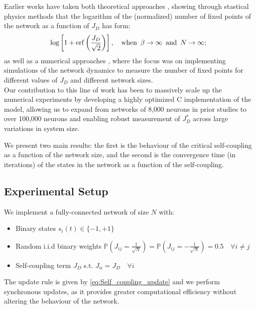 \documentclass[a4paper,12pt]{report}
\begin{document}
Earlier works have taken both theoretical approaches \cite{Scardecchia2023}, showing through stastical 
physics methods that the logarithm of the (normalized) number of fixed points of the 
network as a function of $J_D$ has form:
\begin{equation}
  \log\left[ 1 + \operatorname{erf}\left( \frac{J_D}{\sqrt{2}} \right) \right],
  \quad \text{when}  \hspace{0.5em} \beta \to \infty  \hspace{0.5em} \text{and}  
  \hspace{0.5em} N \to \infty; 
\end{equation}
as well as a numerical approaches \cite{Student2024}, where the focus was on implementing 
simulations of the network dynamics to measure the number of fixed points for different
values of $J_D$ and different network sizes. \\
Our contribution to this line of work has been to massively scale up the numerical 
experiments by developing a highly optimized C implementation of the model, allowing us
to expand from networks of 8,000 neurons in prior studies to over 100,000 neurons and 
enabling robust measurement of \(J_D^*\) across large variations in system size.
\vspace{0.5em}

We present two main results: the first is the behaviour of the critical self-coupling
as a function of the network size, and the second is the convergence time
(in iterations) of the states in the network as a function of the self-coupling.

\subsection*{Experimental Setup}
We implement a fully-connected network of size \(N\) with:
\begin{itemize}
  \item Binary states \(s_i(t) \in \{-1,+1\}\)
  \item Random i.i.d binary weights 
  $\mathbb{P} \left(J_{ij} = \frac{1}{\sqrt{N}} \right) = \mathbb{P} \left(J_{ij} = -
  \frac{1}{\sqrt{N}} \right) = 0.5 
  \hspace{1em} \forall i \neq j$
  \item Self-coupling term $J_D$ s.t. $J_{ii} = J_D \hspace{1em} \forall i$
\end{itemize}
The update rule is given by \eqref{eq:Self_coupling_update} and we perform synchronous 
updates, as it provides greater computational efficiency without altering the behaviour 
of the network.
\vspace*{0.5em}
\end{document}
